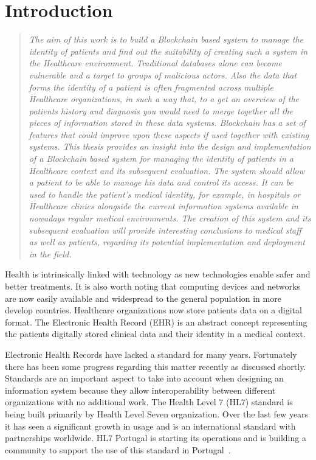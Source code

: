 \chapter{Introduction}\label{introduction}

\begin{quote} 
  \emph{The aim of this work is to build a Blockchain based system to manage
  the identity of patients and find out the suitability of creating such a
  system in the Healthcare environment.  Traditional databases alone can become
  vulnerable and a target to groups of malicious actors. Also the data that
  forms the identity of a patient is often fragmented across multiple
  Healthcare organizations, in such a way that, to a get an overview of the
  patients history and diagnosis you would need to merge together all the
  pieces of information stored in these data systems. Blockchain has a set of
  features that could improve upon these aspects if used together with existing
  systems. This thesis provides an insight into the design and implementation
  of a Blockchain based system for managing the identity of patients in a
  Healthcare context and its subsequent evaluation.  The system should allow a
  patient to be able to manage his data and control its access.  It can be used
  to handle the patient’s medical identity, for example, in hospitals or
  Healthcare clinics alongside the current information systems available in
  nowadays regular medical environments. The creation of this system and its
  subsequent evaluation will provide interesting conclusions to medical staff
  as well as patients, regarding its potential implementation and deployment in
  the field.} 
\end{quote}

Health is intrinsically linked with technology as new technologies enable safer
and better treatments. It is also worth noting that computing devices and
networks are now easily available and widespread to the general population in
more develop countries. Healthcare organizations now store patients data on a
digital format. The Electronic Health Record (EHR) is an abstract concept
representing the patients digitally stored clinical data and their identity in
a medical context.

Electronic Health Records  have lacked a standard for many years. Fortunately
there has been some progress regarding this matter recently as discussed
shortly.  Standards are an important aspect to take into account when designing
an information system because they allow interoperability between different
organizations with no additional work. The Health Level 7 (HL7) standard is
being built primarily by Health Level Seven organization. Over the last few
years it has seen a significant growth in usage and is an international
standard with partnerships worldwide. HL7 Portugal is starting its operations
and is building a community to support the use of this standard in
Portugal~\cite{HealthLevel7}.

